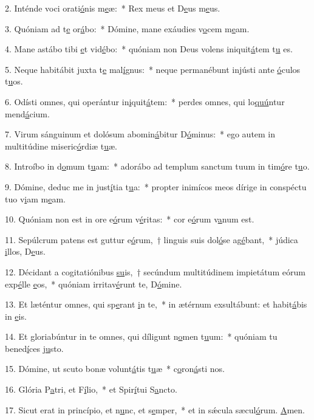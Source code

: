 2. Inténde voci orati\uline{ó}nis m\uline{e}æ:~* Rex meus et D\uline{e}us m\uline{e}us.\par 
3. Quóniam ad t\uline{e} or\uline{á}bo:~* Dómine, mane exáudies v\uline{o}cem m\uline{e}am.\par 
4. Mane astábo tibi \uline{e}t vid\uline{é}bo:~* quóniam non Deus volens iniquit\uline{á}tem t\uline{u} es.\par 
5. Neque habitábit juxta t\uline{e} mal\uline{í}gnus:~* neque permanébunt injústi ante \uline{ó}culos t\uline{u}os.\par 
6. Odísti omnes, qui operántur in\uline{i}quit\uline{á}tem:~* perdes omnes, qui lo\uline{quú}ntur mend\uline{á}cium.\par 
7. Virum sánguinum et dolósum abomin\uline{á}bitur D\uline{ó}minus:~* ego autem in multitúdine miseric\uline{ó}rdiæ t\uline{u}æ.\par 
8. Introíbo in d\uline{o}mum t\uline{u}am:~* adorábo ad templum sanctum tuum in tim\uline{ó}re t\uline{u}o.\par 
9. Dómine, deduc me in just\uline{í}tia t\uline{u}a:~* propter inimícos meos dírige in conspéctu tuo v\uline{i}am m\uline{e}am.\par 
10. Quóniam non est in ore e\uline{ó}rum v\uline{é}ritas:~* cor e\uline{ó}rum v\uline{a}num est.\par 
11. Sepúlcrum patens est guttur e\uline{ó}rum,~† linguis suis dol\uline{ó}se ag\uline{é}bant,~* júdica \uline{i}llos, D\uline{e}us.\par 
12. Décidant a cogitatiónibus \uline{su}is,~† secúndum multitúdinem impietátum eórum exp\uline{é}lle \uline{e}os,~* quóniam irritav\uline{é}runt te, D\uline{ó}mine.\par 
13. Et læténtur omnes, qui sp\uline{e}rant \uline{i}n te,~* in ætérnum exsultábunt: et habit\uline{á}bis in \uline{e}is.\par 
14. Et gloriabúntur in te omnes, qui díligunt n\uline{o}men t\uline{u}um:~* quóniam tu bened\uline{í}ces j\uline{u}sto.\par 
15. Dómine, ut scuto bonæ volunt\uline{á}tis t\uline{u}æ~* c\uline{o}ron\uline{á}sti nos.\par 
16. Glória P\uline{a}tri, et F\uline{í}lio,~* et Spir\uline{í}tui S\uline{a}ncto.\par 
17. Sicut erat in princípio, et n\uline{u}nc, et s\uline{e}mper,~* et in sǽcula sæcul\uline{ó}rum. \uline{A}men.\par 
